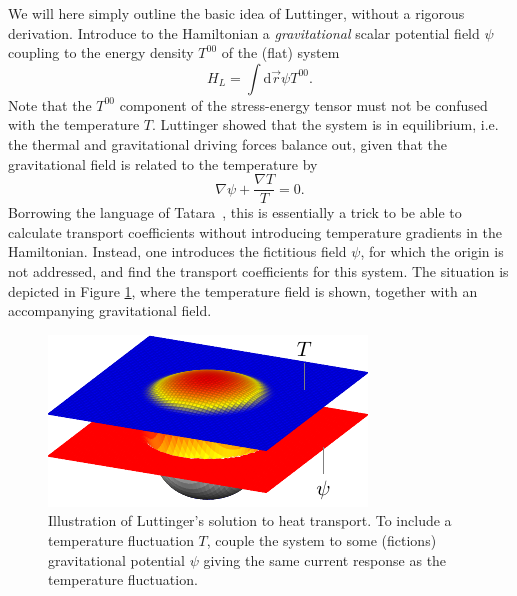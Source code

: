 We will here simply outline the basic idea of Luttinger, without a rigorous derivation.
Introduce to the Hamiltonian a \emph{gravitational} scalar potential field $\psi$ coupling to the energy density $T^{00}$ of the (flat) system~\cite{luttingerTheoryThermalTransport1964}
\begin{equation}
  \label{eq:luttinger-term}
  H_L = \int \mathrm{d}\vec{r} \psi T^{00}.
\end{equation}
Note that the $T^{00}$ component of the stress-energy tensor must not be confused with the temperature $T$.
Luttinger showed that the system is in equilibrium, i.e. the thermal and gravitational driving forces balance out, given that the gravitational field is related to the temperature by
\begin{equation}
  \label{eq:balance}
  \nabla\psi + \frac{\nabla T}{T} = 0.
\end{equation}
Borrowing the language of Tatara~\cite{tataraThermalVectorPotential2015}, this is essentially a trick to be able to calculate transport coefficients without introducing temperature gradients in the Hamiltonian.
Instead, one introduces the fictitious field $\psi$, for which the origin is not addressed, and find the transport coefficients for this system.
The situation is depicted in Figure \ref{fig:luttinger-idea}, where the temperature field is shown, together with an accompanying gravitational field.
\begin{figure}[h]
  \centering
  \includegraphics{figures/LinearResponse_bump}
  \caption{Illustration of Luttinger's solution to heat transport. To include a temperature fluctuation $T$, couple the system to some (fictions) gravitational potential $\psi$ giving the same current response as the temperature fluctuation.}
  \label{fig:luttinger-idea}
\end{figure}

